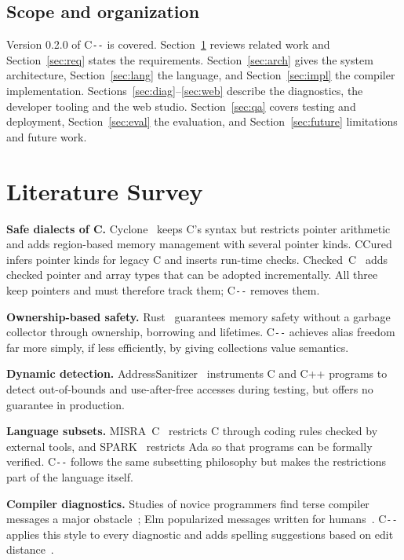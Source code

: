 \documentclass[conference]{IEEEtran}
\newcommand{\cmm}{C\texttt{-{}-}}
\begin{document}
\subsection{Scope and organization}
Version 0.2.0 of \cmm{} is covered. Section~\ref{sec:lit} reviews related work and Section~\ref{sec:req}
states the requirements. Section~\ref{sec:arch} gives the system architecture, Section~\ref{sec:lang} the
language, and Section~\ref{sec:impl} the compiler implementation. Sections~\ref{sec:diag}--\ref{sec:web}
describe the diagnostics, the developer tooling and the web studio. Section~\ref{sec:qa} covers testing and
deployment, Section~\ref{sec:eval} the evaluation, and Section~\ref{sec:future} limitations and future work.

\section{Literature Survey}\label{sec:lit}
\textbf{Safe dialects of C.} Cyclone~\cite{cyclone} keeps C's syntax but restricts pointer arithmetic and adds
region-based memory management with several pointer kinds. CCured~\cite{ccured} infers pointer kinds for
legacy C and inserts run-time checks. Checked~C~\cite{checkedc} adds checked pointer and array types that
can be adopted incrementally. All three keep pointers and must therefore track them; \cmm{} removes them.

\textbf{Ownership-based safety.} Rust~\cite{rust} guarantees memory safety without a garbage collector
through ownership, borrowing and lifetimes. \cmm{} achieves alias freedom far more simply, if less
efficiently, by giving collections value semantics.

\textbf{Dynamic detection.} AddressSanitizer~\cite{asan} instruments C and C++ programs to detect
out-of-bounds and use-after-free accesses during testing, but offers no guarantee in production.

\textbf{Language subsets.} MISRA~C~\cite{misra} restricts C through coding rules checked by external tools,
and SPARK~\cite{spark} restricts Ada so that programs can be formally verified. \cmm{} follows the same
subsetting philosophy but makes the restrictions part of the language itself.

\textbf{Compiler diagnostics.} Studies of novice programmers find terse compiler messages a major
obstacle~\cite{becker2019}; Elm popularized messages written for humans~\cite{elm_errors}. \cmm{} applies this
style to every diagnostic and adds spelling suggestions based on edit
distance~\cite{damerau,levenshtein}.
\end{document}
